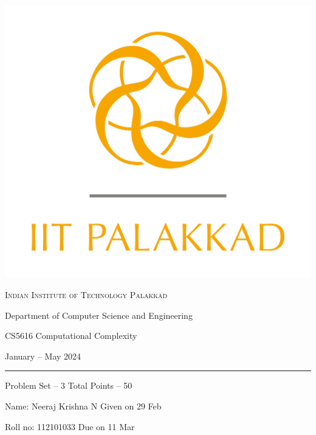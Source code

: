 \documentclass[12pt, a4paper,answers]{exam}
\begin{document}
	
	\noindent
	\begin{minipage}[l]{0.1\textwidth}
		\noindent
		\includegraphics[width=2.4\textwidth]{iitpkd}
	\end{minipage}
	\hfill
	\begin{minipage}[c]{0.8\textwidth}
		\begin{center}
			{\large \textsc{\textcolor{iitpkdcolor}{Indian Institute of Technology Palakkad}} \par
				\small	Department of Computer Science and Engineering	\par
				\large	CS5616 Computational Complexity \par 
				\small January -- May 2024}
		\end{center}
	\end{minipage}
	\par
\vspace{2mm}
\hrule
\vspace{2mm}
\begin{minipage}{0.9\textwidth} 
	\textsf{Problem Set} -- 3  \hfill  \textsf{Total Points} -- 50
	
	{\small \textsf{Name}: Neeraj Krishna N   \hfill \small \textsf{Given on} 29 Feb}

	
	{\small \textsf{Roll no}: 112101033 \hfill \small \textsf{Due on} 11 Mar}
\end{minipage}
	\vspace{0.2in}
\noindent
\end{document}
